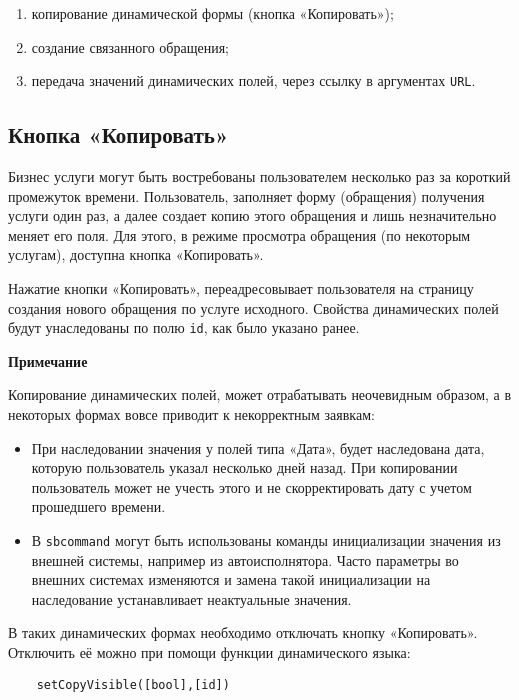 \documentclass[../index.tex]{subfiles}
\begin{document}
\begin{enumerate}
    \item копирование динамической формы (кнопка «Копировать»);
    \item создание связанного обращения;
    \item передача значений динамических полей, через ссылку в аргументах \verb|URL|.
\end{enumerate}


\subsection{Кнопка «Копировать»}
Бизнес услуги могут быть востребованы пользователем несколько раз за короткий промежуток времени.
Пользователь, заполняет форму (обращения) получения услуги один раз, а далее создает копию этого обращения
и лишь незначительно меняет его поля. Для этого, в режиме просмотра обращения (по некоторым услугам),
доступна кнопка «Копировать».

Нажатие кнопки «Копировать», переадресовывает пользователя
на страницу создания нового обращения по услуге исходного.
Свойства динамических полей будут унаследованы по полю \verb|id|, как было указано ранее.


\vspace{5mm}
\textbf{Примечание}


Копирование динамических полей, может отрабатывать неочевидным образом,
а в некоторых формах вовсе приводит к некорректным заявкам:


\begin{itemize}
  \item При наследовании значения у полей типа «Дата», будет наследована дата,
  которую пользователь указал несколько дней назад.
  При копировании пользователь может не учесть этого и не скорректировать дату с учетом прошедшего времени.
  \item В \verb|sbcommand| могут быть использованы команды инициализации значения из внешней системы,
  например из автоисполнятора. Часто параметры во внешних системах изменяются и замена
  такой инициализации на наследование устанавливает неактуальные значения.
\end{itemize}


В таких динамических формах необходимо отключать кнопку «Копировать».
Отключить её можно при помощи функции динамического языка:


\begin{verbatim}
    setCopyVisible([bool],[id])
\end{verbatim}
\end{document}
